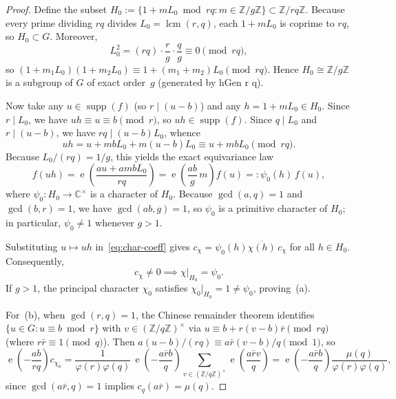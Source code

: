 \documentclass[11pt,reqno]{amsart}
\numberwithin{equation}{section}
\theoremstyle{definition}
\newcommand{\C}{\mathbb{C}}
\newcommand{\Z}{\mathbb{Z}}
\newcommand{\1}{\mathbf{1}}
\newcommand{\e}{\operatorname{e}}
\DeclareMathOperator{\lcm}{lcm}
\DeclareMathOperator{\supp}{supp}
\newcommand{\lean}[1]{{\footnotesize\ttfamily\renewcommand{\_}{\textunderscore\allowbreak}#1}}
\begin{document}
\begin{proof}
Define the subset $H_0 := \{1 + m L_0 \bmod rq : m \in \Z/g\Z\} \subset \Z/rq\Z$. Because every prime dividing $rq$ divides $L_0 = \lcm(r, q)$, each $1 + m L_0$ is coprime to $rq$, so $H_0 \subset G$. Moreover,
\[
  L_0^2 = (rq)\cdot \frac{r}{g}\cdot \frac{q}{g} \equiv 0 \pmod{rq},
\]
so $(1 + m_1 L_0)(1 + m_2 L_0) \equiv 1 + (m_1 + m_2) L_0 \pmod{rq}$. Hence $H_0 \cong \Z/g\Z$ is a subgroup of $G$ of exact order~$g$ (generated by \lean{hGen r q}).

Now take any $u \in \supp(f)$ (so $r \mid (u - b)$) and any $h = 1 + m L_0 \in H_0$. Since $r \mid L_0$, we have $uh \equiv u \equiv b \pmod r$, so $uh \in \supp(f)$. Since $q \mid L_0$ and $r \mid (u-b)$, we have $rq \mid (u-b)L_0$, whence
\[
  u h = u + m b L_0 + m(u - b)L_0 \equiv u + m b L_0 \pmod{rq}.
\]
Because $L_0 / (rq) = 1/g$, this yields the exact equivariance law
\[
  f(u h) = \e\!\left(\frac{a u + a m b L_0}{rq}\right) = \e\!\left(\frac{a b}{g}\, m\right) f(u) =: \psi_0(h)\, f(u),
\]
where $\psi_0 : H_0 \to \C^\times$ is a character of $H_0$. Because $\gcd(a, q) = 1$ and $\gcd(b, r) = 1$, we have $\gcd(ab, g) = 1$, so $\psi_0$ is a primitive character of $H_0$; in particular, $\psi_0 \neq 1$ whenever $g > 1$.

Substituting $u \mapsto u h$ in~\eqref{eq:char-coeff} gives $c_\chi = \psi_0(h)\overline{\chi(h)}\, c_\chi$ for all $h \in H_0$. Consequently,
\begin{equation}\label{eq:char-fiber}
  c_\chi \neq 0 \implies \chi|_{H_0} = \psi_0.
\end{equation}
If $g > 1$, the principal character $\chi_0$ satisfies $\chi_0|_{H_0} = 1 \neq \psi_0$, proving~(a).

For~(b), when $\gcd(r, q) = 1$, the Chinese remainder theorem identifies $\{u \in G : u \equiv b \bmod r\}$ with $v \in (\Z/q\Z)^\times$ via $u \equiv b + r(v - b)\bar{r} \pmod{rq}$ (where $r\bar{r} \equiv 1 \pmod q$). Then $a(u - b)/(rq) \equiv a\bar{r}(v - b)/q \pmod 1$, so
\[
  \e\!\left(-\frac{ab}{rq}\right) c_{\chi_0}
  = \frac{1}{\varphi(r)\varphi(q)}\,\e\!\left(-\frac{a\bar{r}b}{q}\right)\sum_{v \in (\Z/q\Z)^\times} \e\!\left(\frac{a\bar{r}v}{q}\right)
  = \e\!\left(-\frac{a\bar{r}b}{q}\right)\frac{\mu(q)}{\varphi(r)\varphi(q)},
\]
since $\gcd(a\bar{r}, q) = 1$ implies $c_q(a\bar{r}) = \mu(q)$.


\end{proof}
\end{document}
